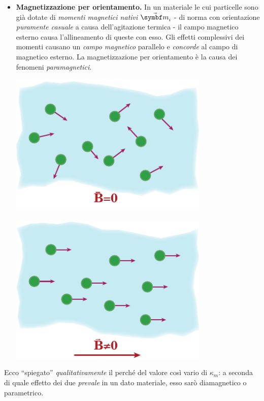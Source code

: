\begin{itemize}
\begin{minipage}{0.49\textwidth}
\begin{center}
		\end{center}
	\end{minipage}
	\item \textbf{Magnetizzazione per orientamento.} In un materiale le cui particelle sono già dotate di \textit{momenti magnetici nativi} $\vba{m}_i$ - di norma con orientazione \textit{puramente casuale} a causa dell'agitazione termica - il campo magnetico esterno causa l'allineamento di queste con esso. Gli effetti complessivi dei momenti causano un \textit{campo magnetico} parallelo e \textit{concorde} al campo di magnetico esterno. La magnetizzazione per orientamento è la causa dei fenomeni \textit{paramagnetici}.\\
	\begin{minipage}{0.49\textwidth}
		\begin{center}
			\includegraphics[width=0.75\textwidth]{images/chp12/chp12orientamento1.pdf}
		\end{center}
	\end{minipage}
	\begin{minipage}{0.49\textwidth}
		\begin{center}
			\includegraphics[width=0.75\textwidth]{images/chp12/chp12orientamento2.pdf}
		\end{center}
	\end{minipage}
\end{itemize}
Ecco ``spiegato'' \textit{qualitativamente} il perché del valore così vario di $\kappa_m$: a seconda di quale effetto dei due \textit{prevale} in un dato materiale, esso sarò diamagnetico o parametrico.
